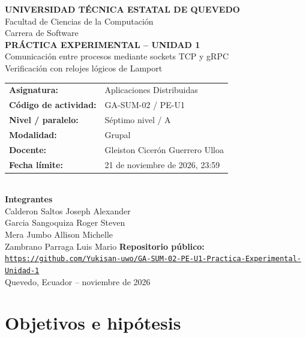 \documentclass[11pt,a4paper,oneside]{article}
\begin{document}
\hypersetup{pageanchor=false}
\begin{titlepage}
\centering
{\Large\textbf{UNIVERSIDAD TÉCNICA ESTATAL DE QUEVEDO}}\\[0.45cm]
{\large Facultad de Ciencias de la Computación}\\[0.15cm]
{\large Carrera de Software}\\[1.35cm]
{\LARGE\bfseries PRÁCTICA EXPERIMENTAL -- UNIDAD 1}\\[0.3cm]
{\Large Comunicación entre procesos mediante sockets TCP y gRPC}\\[0.25cm]
{\large Verificación con relojes lógicos de Lamport}\\[1.3cm]
\begin{tabular}{@{}ll@{}}
\textbf{Asignatura:} & Aplicaciones Distribuidas \\
\textbf{Código de actividad:} & GA-SUM-02 / PE-U1 \\
\textbf{Nivel / paralelo:} & Séptimo nivel / A \\
\textbf{Modalidad:} & Grupal \\
\textbf{Docente:} & Gleiston Cicerón Guerrero Ulloa \\
\textbf{Fecha límite:} & 21 de noviembre de 2026, 23:59 \\
\end{tabular}
\\[1.0cm]
{\large\textbf{Integrantes}}\\[0.25cm]
Calderon Saltos Joseph Alexander \\[0.12cm]
Garcia Sangoquiza Roger Steven \\[0.12cm]
Mera Jumbo Allison Michelle \\[0.12cm]
Zambrano Parraga Luis Mario
\vfill
\textbf{Repositorio público:}\\[0.1cm]
{\scriptsize\href{https://github.com/Yukisan-uwo/GA-SUM-02-PE-U1-Practica-Experimental-Unidad-1}{\nolinkurl{https://github.com/Yukisan-uwo/GA-SUM-02-PE-U1-Practica-Experimental-Unidad-1}}}
\\[0.7cm]
{\small Quevedo, Ecuador -- noviembre de 2026}
\end{titlepage}

\hypersetup{pageanchor=true}

\tableofcontents
\clearpage
{}

\section{Objetivos e hipótesis}

\end{document}

